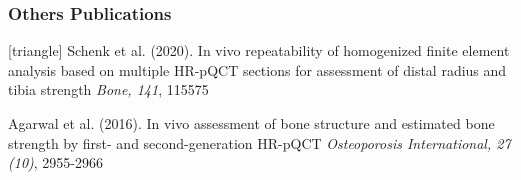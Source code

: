 \documentclass[xcolor=table]{beamer}
\begin{document}

\begin{frame}
	\frametitle{Others Publications}
	\footnotesize{
		\begin{thebibliography}{99}
			[triangle]
			 Schenk et al. (2020).
			\newblock In vivo repeatability of homogenized finite element analysis based on multiple HR-pQCT sections for assessment of distal radius and tibia strength
			\newblock \textit{Bone, 141}, 115575
			
			\vspace{1mm}
			
			 Agarwal et al. (2016).
			\newblock In vivo assessment of bone structure and estimated bone strength by first- and second-generation HR-pQCT
			\newblock \textit{Osteoporosis International, 27 (10)}, 2955-2966
			
		\end{thebibliography}
	}
\end{frame}


\end{document}
